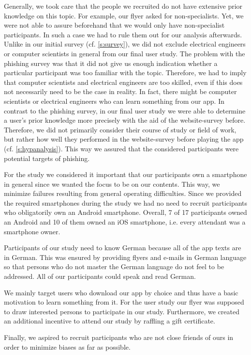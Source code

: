 \begin{description}[leftmargin=0cm]
	\item[Attackability:] Generally, we took care that the people we recruited do not have extensive prior knowledge on this topic.
For example, our flyer asked for non-specialists.
Yet, we were not able to assure beforehand that we would only have non-specialist participants.
In such a case we had to rule them out for our analysis afterwards.
Unlike in our initial survey (cf. \autoref{s:survey}), we did not exclude electrical engineers or computer scientists in general from our final user study.
The problem with the phishing survey was that it did not give us enough indication whether a particular participant was too familiar with the topic.
Therefore, we had to imply that computer scientists and electrical engineers are too skilled, even if this does not necessarily need to be the case in reality.
In fact, there might be computer scientists or electrical engineers who can learn something from our app.
In contrast to the phishing survey, in our final user study we were able to determine a user's prior knowledge more precisely with the aid of the website-survey before.
Therefore, we did not primarily consider their course of study or field of work, but rather how well they performed in the website-survey before playing the app (cf. \autoref{s:hypanalysis}).
This way we assured that the considered participants were potential targets of phishing.
	\item[Android Users:] For the study we considered it important that our participants own a smartphone in general since we wanted the focus to be on our contents. This way, we minimize failures resulting from general operating difficulties.
Since we provided the required smartphones during the study we had no need to recruit participants who obligatorily own an Android smartphone.
Overall, 7 of 17 participants owned an Android and 10 of them owned an iOS smartphone, i.e. every attendant was a smartphone owner.
	\item[Language:] Participants of our study need to know German because all of the app texts are in German. This was ensured by providing flyers and e-mails in German language so that persons who do not master the German language do not feel to be addressed.
All of our participants could speak and read German.
\item[Motivation:] We mainly target users who download our app by choice and thus have a basic motivation to learn something from it.
For the user study our flyer was supposed to draw interested persons to participate in our study.
Furthermore, we created an additional incentive to attend our study by raffling a gift certificate.
\end{description}
Finally, we aspired to recruit participants who are not close friends of ours in order to minimize biases as far as possible.
